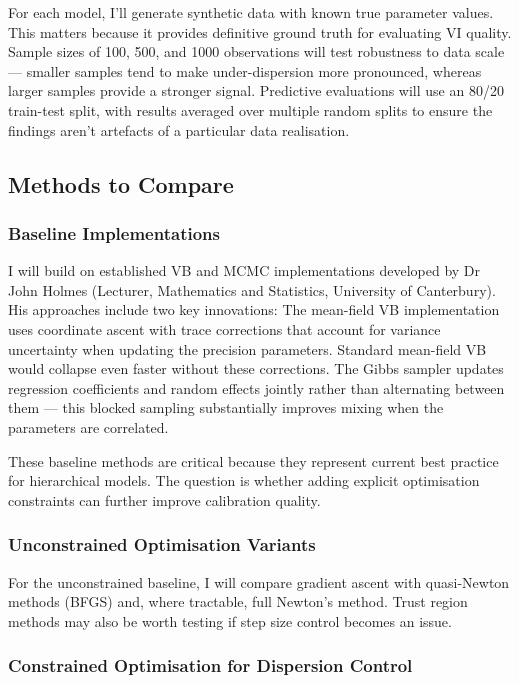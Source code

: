 \documentclass[11pt,a4paper]{article}
\begin{document}
For each model, I'll generate synthetic data with known true parameter values. This matters because it provides definitive ground truth for evaluating VI quality. Sample sizes of 100, 500, and 1000 observations will test robustness to data scale — smaller samples tend to make under-dispersion more pronounced, whereas larger samples provide a stronger signal. Predictive evaluations will use an 80/20 train-test split, with results averaged over multiple random splits to ensure the findings aren't artefacts of a particular data realisation.

\subsection{Methods to Compare}

\subsubsection*{Baseline Implementations}

I will build on established VB and MCMC implementations developed by Dr John Holmes (Lecturer, Mathematics and Statistics, University of Canterbury). His approaches include two key innovations:
\newpage
The mean-field VB implementation uses coordinate ascent with trace corrections that account for variance uncertainty when updating the precision parameters. Standard mean-field VB would collapse even faster without these corrections. The Gibbs sampler updates regression coefficients and random effects jointly rather than alternating between them — this blocked sampling substantially improves mixing when the parameters are correlated.

These baseline methods are critical because they represent current best practice for hierarchical models. The question is whether adding explicit optimisation constraints can further improve calibration quality.

\subsubsection*{Unconstrained Optimisation Variants}

For the unconstrained baseline, I will compare gradient ascent with quasi-Newton methods (BFGS) and, where tractable, full Newton's method. Trust region methods may also be worth testing if step size control becomes an issue.

\subsubsection*{Constrained Optimisation for Dispersion Control}
\end{document}

